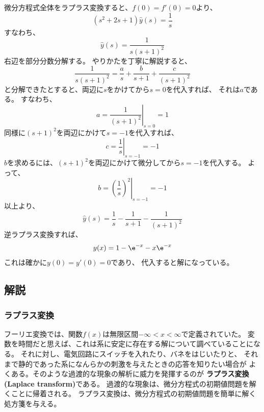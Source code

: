 微分方程式全体をラプラス変換すると、$f(0)=f'(0)=0$より、
\begin{equation}
  (s^2 + 2s +1) \hat{y}(s) = \frac{1}{s}
\end{equation}
すなわち、
\begin{equation}
  \hat{y}(s) = \frac{1}{s(s+1)^2}
\end{equation}
右辺を部分分数分解する。
やりかたを丁寧に解説すると、
\begin{equation}
  \frac{1}{s(s+1)^2} = \frac{a}{s} + \frac{b}{s+1} + \frac{c}{(s+1)^2}
\end{equation}
と分解できたとすると、両辺に$s$をかけてから$s=0$を代入すれば、
それは$a$である。
すなわち、
\begin{equation}
  a = \left. \frac{1}{(s+1)^2}\right|_{s=0} = 1
\end{equation}
同様に$(s+1)^2$を両辺にかけて$s=-1$を代入すれば、
\begin{equation}
  c = \left. \frac{1}{s}\right|_{s=-1} = -1
\end{equation}
$b$を求めるには、$(s+1)^2$を両辺にかけて微分してから$s=-1$を代入する。
よって、
\begin{equation}
  b = \left. \left(\frac{1}{s}\right)^2 \right|_{s=-1} = -1
\end{equation}
以上より、
\begin{equation}
  \hat{y}(s) =  \frac{1}{s} - \frac{1}{s+1} - \frac{1}{(s+1)^2}
\end{equation}
逆ラプラス変換すれば、
\begin{equation}
  y(x) =  1 - \e^{-x} - x\e^{-x}
\end{equation}
これは確かに$y(0)=y'(0) = 0$であり、
代入すると解になっている。


\subsection{解説}

\subsubsection{ラプラス変換}

フーリエ変換では、関数$f(x)$は無限区間$-\infty < x < \infty$で定義されていた。
変数を時間だと思えば、これは系に安定に存在する解について調べていることになる。
それに対し、電気回路にスイッチを入れたり、バネをはじいたりと、
それまで静的であった系になんらかの刺激を与えたときの応答を知りたい場合が
よくある。そのような過渡的な現象の解析に威力を発揮するのが
{\bf ラプラス変換 (Laplace transform)}である。
過渡的な現象は、微分方程式の初期値問題を解くことに帰着される。
ラプラス変換は、微分方程式の初期値問題を簡単に解く処方箋を与える。

